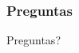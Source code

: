 \documentclass{beamer}
\begin{document}

%

\begin{frame}
  \frametitle{Preguntas}
  \hspace{4cm}\huge{Preguntas?}  
\end{frame}
\end{document}
